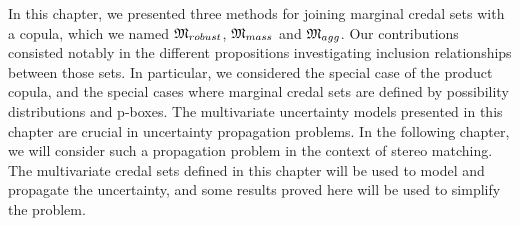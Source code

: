 \begin{conclusion}
    In this chapter, we presented three methods for joining marginal credal sets with a copula, which we named $\mathfrak{M}_{robust}$, $\mathfrak{M}_{mass}$ and $\mathfrak{M}_{agg}$. Our contributions consisted notably in the different propositions investigating inclusion relationships between those sets. In particular, we considered the special case of the product copula, and the special cases where marginal credal sets are defined by possibility distributions and p-boxes. The multivariate uncertainty models presented in this chapter are crucial in uncertainty propagation problems. In the following chapter, we will consider such a propagation problem in the context of stereo matching. The multivariate credal sets defined in this chapter will be used to model and propagate the uncertainty, and some results proved here will be used to simplify the problem.
\end{conclusion}
 
\clearpage
